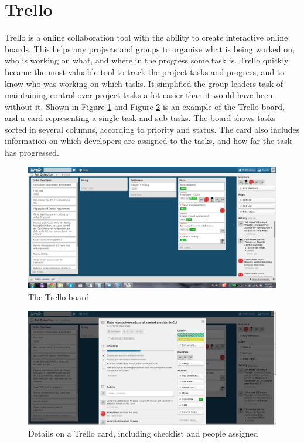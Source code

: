 \section{Trello}  

Trello \label{def:trello} is a online collaboration tool with the ability to create interactive online boards. This helps any projects and groups to organize what is being worked on, who is working on what, and where in the progress some task is. Trello quickly became the most valuable tool to track the project tasks and progress, and to know who was working on which tasks. It simplified the group leaders task of maintaining control over project tasks a lot easier than it would have been without it. Shown in Figure \ref{img:trelloBoard} and Figure \ref{img:trelloCard} is an example of the Trello board, and a card representing a single task and sub-tasks. The board shows tasks sorted in several columns, according to priority and status. The card also includes information on which developers are assigned to the tasks, and how far the task has progressed. 
\begin{figure}
\includegraphics[width=\textwidth]{Res/TrelloBoard}
\caption{The Trello board}
\label{img:trelloBoard}
\end{figure}
\begin{figure}
\includegraphics[width=\textwidth]{Res/TrelloCard}
\caption{Details on a Trello card, including checklist and people assigned}
\label{img:trelloCard}
\end{figure}


